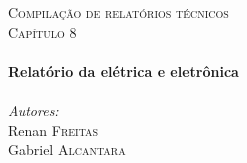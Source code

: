 \center %
 

\textsc{\LARGE Compilação de relatórios técnicos}\\[1.5cm]
\textsc{\Large Capítulo 8}\\[0.5cm] 


\HRule \\[0.4cm]
{ \huge \bfseries Relatório da elétrica e eletrônica}\\[0.4cm] %
\HRule \\[1.5cm]
 


\Large \emph{Autores:}\\
Renan \textsc{Freitas}\\
Gabriel \textsc{Alcantara}\\



